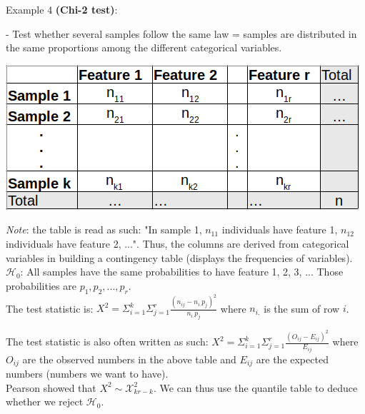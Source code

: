 \vspace{5mm}

Example 4 \textbf{(Chi-2 test)}:

\vspace{5mm}

- Test whether several samples follow the same law = samples are distributed in the same proportions among the different categorical variables. \\

\begin{center}
\includegraphics[scale=0.6]{chi-2-table.png}
\end{center}

\textit{Note}: the table is read as such: "In sample 1, $n_{11}$ individuals have feature 1, $n_{12}$ individuals have feature 2, ...". Thus, the columns are derived from categorical variables in building a contingency table (displays the frequencies of variables). \\

$\mathcal{H}_0$: All samples have the same probabilities to have feature 1, 2, 3, ... Those probabilities are  $p_1, p_2, ..., p_r$. \\

The test statistic is: $X^2 = \Sigma_{i=1}^k \Sigma_{j=1}^r \frac{(n_{ij} - n_{i.}p_j)^2}{n_{i.}p_j}$ where $n_{i.}$ is the sum of row $i$.

The test statistic is also often written as such: $X^2 = \Sigma_{i=1}^k \Sigma_{j=1}^r \frac{(O_{ij} - E_{ij})^2}{E_{ij}}$ where $O_{ij}$ are the observed numbers in the above table and $E_{ij}$ are the expected numbers (numbers we want to have). \\

Pearson showed that $X^2 \sim \mathcal{X}^2_{kr-k}$. We can thus use the quantile table to deduce whether we reject $\mathcal{H}_0$.

\vspace{5mm}